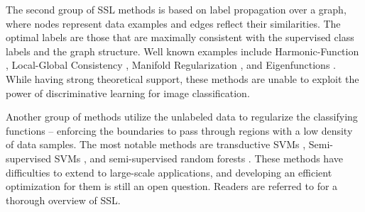 \documentclass[preprint,12pt,3p]{elsarticle}
\begin{document}
The second group of SSL methods is based on label propagation over a
graph, where nodes represent data examples and edges reflect their
similarities. The optimal labels are those that are maximally
consistent with the supervised class labels and the graph
structure. Well known examples include Harmonic-Function
\citep{Zhu:Harmonic:03}, Local-Global Consistency \citep{Zhou:nips:04},
Manifold Regularization \citep{Belkin:semiframe:2006}, and
Eigenfunctions \citep{Fergus09}. While having strong theoretical
support, these methods are unable to exploit the power of
discriminative learning for image classification.

Another group of methods utilize the unlabeled data to regularize the
classifying functions -- enforcing the boundaries to pass through
regions with a low density of data samples. The most notable methods
are transductive SVMs \citep{Joachims:1999}, Semi-supervised
SVMs \citep{SemiSVM}, and semi-supervised random
forests \citep{SemiForest}. These methods have difficulties to extend to
large-scale applications, and developing an efficient optimization for
them is still an open question.  Readers are referred
to \citep{Zhu:ISL:2009} for a thorough overview of SSL.



\end{document}
